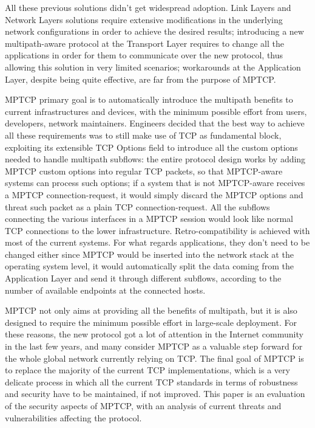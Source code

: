 \vspace{5mm}
All these previous solutions didn't get widespread adoption. Link Layers and Network Layers solutions require extensive modifications in the underlying network configurations in order to achieve the desired results; introducing a new multipath-aware protocol at the Transport Layer requires to change all the applications in order for them to communicate over the new protocol, thus allowing this solution in very limited scenarios; workarounds at the Application Layer, despite being quite effective, are far from the purpose of MPTCP.


MPTCP primary goal is to automatically introduce the multipath benefits to current infrastructures and devices, with the minimum possible effort from users, developers, network maintainers. Engineers decided that the best way to achieve all these requirements was to still make use of TCP as fundamental block, exploiting its extensible TCP Options field to introduce all the custom options needed to handle multipath subflows: the entire protocol design works by adding MPTCP custom options into regular TCP packets, so that MPTCP-aware systems can process such options; if a system that is not MPTCP-aware receives a MPTCP connection-request, it would simply discard the MPTCP options and threat such packet as a plain TCP connection-request. All the subflows connecting the various interfaces in a MPTCP session would look like normal TCP connections to the lower infrastructure. Retro-compatibility is achieved with most of the current systems. For what regards applications, they don't need to be changed either since MPTCP would be inserted into the network stack at the operating system level, it would automatically split the data coming from the Application Layer and send it through different subflows, according to the number of available endpoints at the connected hosts.

\vspace{5mm}
MPTCP not only aims at providing all the benefits of multipath, but it is also designed to require the minimum possible effort in large-scale deployment. For these reasons, the new protocol got a lot of attention in the Internet community in the last few years, and many consider MPTCP as a valuable step forward for the whole global network currently relying on TCP.
The final goal of MPTCP is to replace the majority of the current TCP implementations, which is a very delicate process in which all the current TCP standards in terms of robustness and security have to be maintained, if not improved. This paper is an evaluation of the security aspects of MPTCP, with an analysis of current threats and vulnerabilities affecting the protocol.

